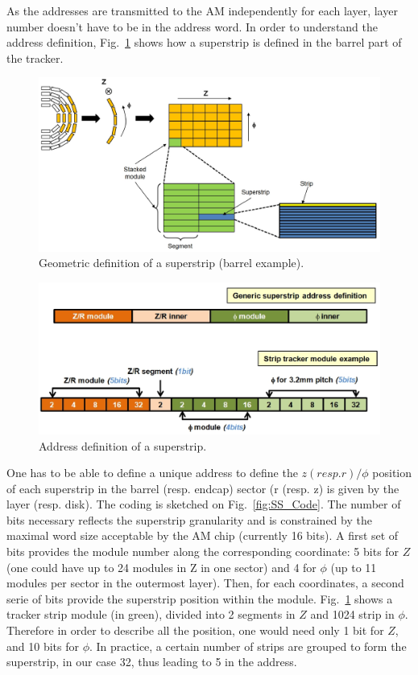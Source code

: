 \noindent As the addresses are transmitted to the AM independently for each layer, layer number doesn't have to be in the address word. In order to understand the address definition, Fig.~\ref{fig:sstrip_def} shows how a superstrip is defined in the barrel part of the tracker.  
\begin{figure}[ht!]
\centering
\includegraphics[width=0.7\columnwidth]{Plots/SStripDef.eps}
\caption{Geometric definition of a superstrip (barrel example).}
\label{fig:sstrip_def}
\end{figure}
\begin{figure}[ht!]
\centering
\includegraphics[width=0.7\columnwidth]{Plots/SSaddress.eps}
\caption{Address definition of a superstrip.}
\label{fig:SS_code}
\end{figure}

\noindent One has to be able to define a unique address to define the $z (resp. r)/\phi$ position of each superstrip in the barrel (resp. endcap) sector (r (resp. z) is given by the layer (resp. disk). The coding is sketched on Fig.~\ref{fig:SS_Code}. The number of bits necessary reflects the superstrip granularity and is constrained by the maximal word size acceptable by the AM chip (currently 16 bits). A first set of bits provides the module number along the corresponding coordinate: 5 bits for $Z$ (one could have up to 24 modules in Z in one sector) and 4 for $\phi$ (up to 11 modules per sector in the outermost layer). Then, for each coordinates, a second serie of bits provide the superstrip position within the module. Fig.~\ref{fig:sstrip_def} shows a tracker strip module (in green), divided into 2 segments in $Z$ and 1024 strip in $\phi$. Therefore in order to describe all the position, one would need only 1 bit for $Z$, and 10 bits for $\phi$. In practice, a certain number of strips are grouped to form the superstrip, in our case 32, thus leading to 5 in the address.   

